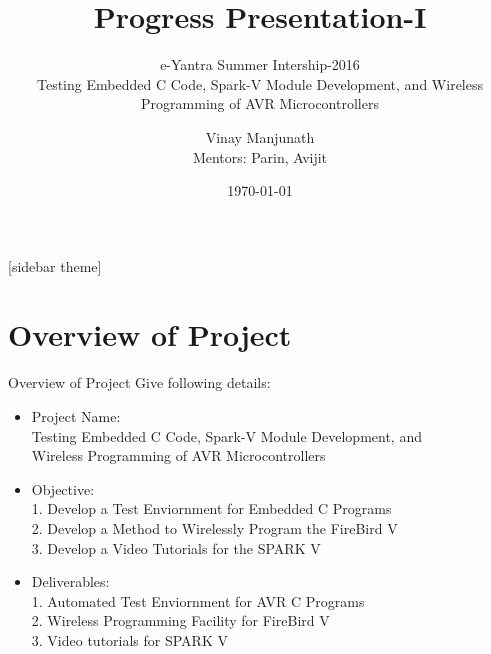 \documentclass[10pt, a4paper]{beamer}
\begin{document}
	\title{Progress Presentation-I}
	\subtitle{e-Yantra Summer Intership-2016 \\ Testing Embedded C Code, Spark-V Module Development, and Wireless Programming of AVR Microcontrollers }
	\author{Vinay Manjunath \\
	Mentors: Parin, Avijit}
	\date{\today}
	\frame{\titlepage}

[sidebar theme]
\section{Overview of Project}
\begin{frame}{Overview of Project}
	Give following details: \\
	\begin{itemize}
		\item Project Name:\\
	        \hspace{.1cm} Testing Embedded C Code, Spark-V Module Development, and \\
		\hspace{.1cm} Wireless Programming of AVR Microcontrollers \\
		\item Objective:\\
		\hspace{.1cm} 1. Develop a Test Enviornment for Embedded C Programs\\
		\hspace{.1cm} 2. Develop a Method to Wirelessly Program the FireBird V\\
		\hspace{.1cm} 3. Develop a Video Tutorials for the SPARK V \\
		\item Deliverables:\\
		\hspace{.1cm} 1. Automated Test Enviornment for AVR C Programs\\
		\hspace{.1cm} 2. Wireless Programming Facility for FireBird V\\
		\hspace{.1cm} 3. Video tutorials for SPARK V\\
	\end{itemize}
\end{frame}
\end{document}
